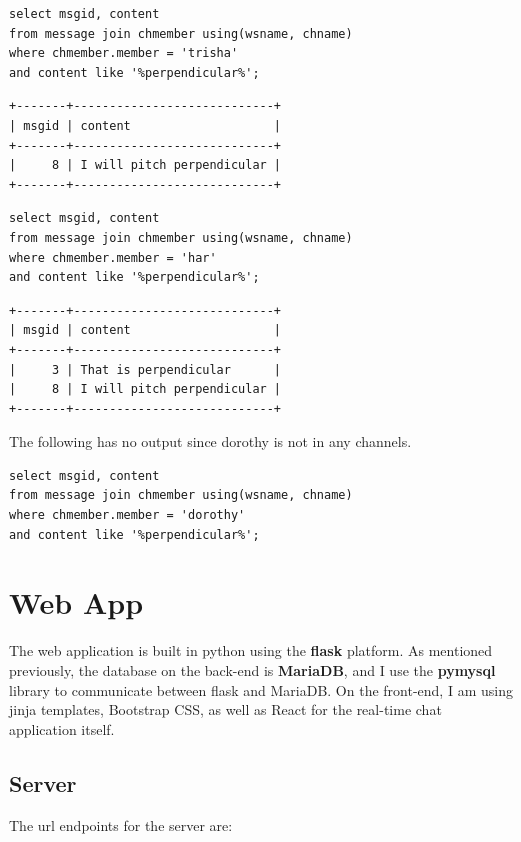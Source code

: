 \documentclass{article}
\begin{document}
\begin{enumerate}
\begin{lstlisting}
select msgid, content
from message join chmember using(wsname, chname)
where chmember.member = 'trisha'
and content like '%perpendicular%';
\end{lstlisting}
\begin{verbatim}
+-------+----------------------------+
| msgid | content                    |
+-------+----------------------------+
|     8 | I will pitch perpendicular |
+-------+----------------------------+
\end{verbatim}

\begin{lstlisting}
select msgid, content
from message join chmember using(wsname, chname)
where chmember.member = 'har'
and content like '%perpendicular%';
\end{lstlisting}
\begin{verbatim}
+-------+----------------------------+
| msgid | content                    |
+-------+----------------------------+
|     3 | That is perpendicular      |
|     8 | I will pitch perpendicular |
+-------+----------------------------+
\end{verbatim}

The following has no output since dorothy is not in any channels.
\begin{lstlisting}
select msgid, content
from message join chmember using(wsname, chname)
where chmember.member = 'dorothy'
and content like '%perpendicular%';
\end{lstlisting}

\end{enumerate}

\section{Web App}

The web application is built in python using the \textbf{flask} platform. As mentioned previously, the database on the back-end is \textbf{MariaDB}, and I use the \textbf{pymysql} library to communicate between flask and MariaDB. On the front-end, I am using jinja templates, Bootstrap CSS, as well as React for the real-time chat application itself.

\subsection{Server}

\noindent The url endpoints for the server are:
\end{document}
